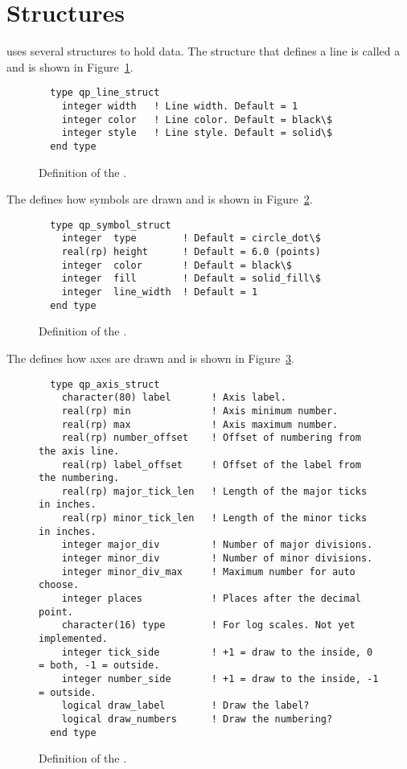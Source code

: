 \section{Structures}
\label{s:qp_structs}

\quickplot uses several structures to hold data. The structure that
defines a line is called a  and is shown in
Figure~\ref{f:qp_line_struct}. 
\begin{figure}[htb]
\centering
\begin{verbatim}
  type qp_line_struct
    integer width   ! Line width. Default = 1
    integer color   ! Line color. Default = black\$
    integer style   ! Line style. Default = solid\$
  end type
\end{verbatim}
\caption{Definition of the .}
\label{f:qp_line_struct}
\end{figure}

The  defines how symbols are drawn and is shown
in Figure~\ref{f:qp_sym_struct}.
\begin{figure}[htb]
\centering
\begin{verbatim}
  type qp_symbol_struct
    integer  type        ! Default = circle_dot\$
    real(rp) height      ! Default = 6.0 (points)
    integer  color       ! Default = black\$
    integer  fill        ! Default = solid_fill\$
    integer  line_width  ! Default = 1
  end type
\end{verbatim}
\caption{Definition of the .}
\label{f:qp_sym_struct}
\end{figure}

The  defines how axes are drawn and is shown
in Figure~\ref{f:qp_axis_struct}.
\begin{figure}[htb]
\centering
\begin{verbatim}
  type qp_axis_struct
    character(80) label       ! Axis label.
    real(rp) min              ! Axis minimum number.
    real(rp) max              ! Axis maximum number.
    real(rp) number_offset    ! Offset of numbering from the axis line.
    real(rp) label_offset     ! Offset of the label from the numbering.
    real(rp) major_tick_len   ! Length of the major ticks in inches.
    real(rp) minor_tick_len   ! Length of the minor ticks in inches.
    integer major_div         ! Number of major divisions.
    integer minor_div         ! Number of minor divisions.
    integer minor_div_max     ! Maximum number for auto choose.
    integer places            ! Places after the decimal point.
    character(16) type        ! For log scales. Not yet implemented.
    integer tick_side         ! +1 = draw to the inside, 0 = both, -1 = outside.
    integer number_side       ! +1 = draw to the inside, -1 = outside.
    logical draw_label        ! Draw the label?
    logical draw_numbers      ! Draw the numbering?
  end type
\end{verbatim}
\caption{Definition of the .}
\label{f:qp_axis_struct}
\end{figure}